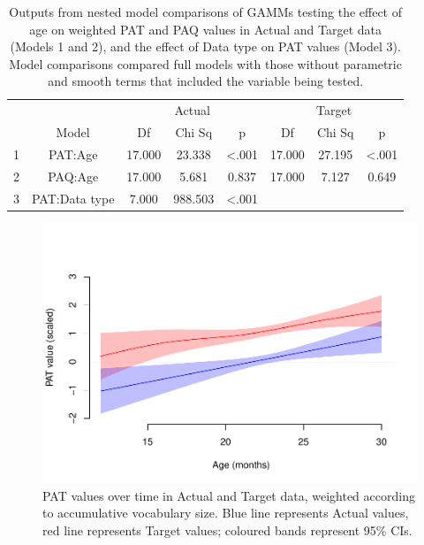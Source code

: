 \documentclass[
  man,mask,floatsintext]{apa6}
\begin{document}
\begin{longtable}[t]{cccccccc}
\caption{\label{tab:table-GAMM-outputs}Outputs from nested model comparisons of GAMMs testing the effect of age on weighted PAT and PAQ values in Actual and Target data (Models 1 and 2), and the effect of Data type on PAT values (Model 3). Model comparisons compared full models with those without parametric and smooth terms that included the variable being tested.}\\
\toprule
\multicolumn{2}{c}{ } & \multicolumn{3}{c}{Actual} & \multicolumn{3}{c}{Target} \\
\cmidrule(l{3pt}r{3pt}){3-5} \cmidrule(l{3pt}r{3pt}){6-8}
  & Model & Df & Chi Sq & p & Df & Chi Sq & p\\
\midrule
1 & PAT:Age & 17.000 & 23.338 & <.001 & 17.000 & 27.195 & <.001\\
2 & PAQ:Age & 17.000 & 5.681 & 0.837 & 17.000 & 7.127 & 0.649\\
3 & PAT:Data type & 7.000 & 988.503 & <.001 &  &  & \\
\bottomrule
\end{longtable}

\begin{figure}
\centering
\includegraphics{PhonNetworksProj-anon_files/figure-latex/figure-GAMM-PAT-1.pdf}
\caption{\label{fig:figure-GAMM-PAT}PAT values over time in Actual and Target data, weighted according to accumulative vocabulary size. Blue line represents Actual values, red line represents Target values; coloured bands represent 95\% CIs.}
\end{figure}
\end{document}
